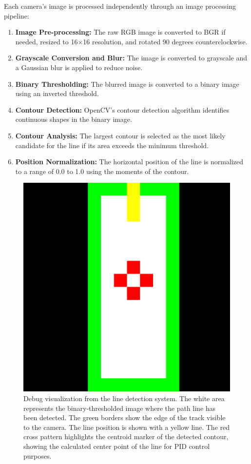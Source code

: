 \documentclass[9pt,technote]{IEEEtran}
\begin{document}
Each camera's image is processed independently through an image processing pipeline:

\begin{enumerate}
    \item \textbf{Image Pre-processing:} The raw RGB image is converted to BGR if needed, resized to 16×16 resolution, and rotated 90 degrees counterclockwise.
    
    \item \textbf{Grayscale Conversion and Blur:} The image is converted to grayscale and a Gaussian blur is applied to reduce noise.
    
    \item \textbf{Binary Thresholding:} The blurred image is converted to a binary image using an inverted threshold.
    
    \item \textbf{Contour Detection:} OpenCV's contour detection algorithm identifies continuous shapes in the binary image.
    
    \item \textbf{Contour Analysis:} The largest contour is selected as the most likely candidate for the line if its area exceeds the minimum threshold.
    
    \item \textbf{Position Normalization:} The horizontal position of the line is normalized to a range of 0.0 to 1.0 using the moments of the contour.
\end{enumerate}

\begin{figure}[H]
 \centering
\includegraphics[width=0.6\columnwidth]{figures/line_detection_cameras.png}
\caption{Debug visualization from the line detection system. The white area represents the binary-thresholded image where the path line has been detected. The green borders show the edge of the track visible to the camera. The line position is shown with a yellow line. The red cross pattern highlights the centroid marker of the detected contour, showing the calculated center point of the line for PID control purposes.}
\label{fig:camera_debug}
\end{figure}
\end{document}
